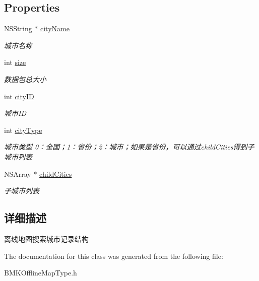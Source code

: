 \subsection*{Properties}
\begin{DoxyCompactItemize}
\item 
\hypertarget{interface_b_m_k_o_l_search_record_a9b511c21c21f4b67eef345b11c0e9826}{N\-S\-String $\ast$ \hyperlink{interface_b_m_k_o_l_search_record_a9b511c21c21f4b67eef345b11c0e9826}{city\-Name}}\label{interface_b_m_k_o_l_search_record_a9b511c21c21f4b67eef345b11c0e9826}

\begin{DoxyCompactList}\small\item\em 城市名称 \end{DoxyCompactList}\item 
\hypertarget{interface_b_m_k_o_l_search_record_a65d925120ac45eec0047bad23225f67f}{int \hyperlink{interface_b_m_k_o_l_search_record_a65d925120ac45eec0047bad23225f67f}{size}}\label{interface_b_m_k_o_l_search_record_a65d925120ac45eec0047bad23225f67f}

\begin{DoxyCompactList}\small\item\em 数据包总大小 \end{DoxyCompactList}\item 
\hypertarget{interface_b_m_k_o_l_search_record_a45d36f0768cca26895c7078900ad8d7b}{int \hyperlink{interface_b_m_k_o_l_search_record_a45d36f0768cca26895c7078900ad8d7b}{city\-I\-D}}\label{interface_b_m_k_o_l_search_record_a45d36f0768cca26895c7078900ad8d7b}

\begin{DoxyCompactList}\small\item\em 城市\-I\-D \end{DoxyCompactList}\item 
\hypertarget{interface_b_m_k_o_l_search_record_a74c11b249d3d97503c4a4efa880cc99a}{int \hyperlink{interface_b_m_k_o_l_search_record_a74c11b249d3d97503c4a4efa880cc99a}{city\-Type}}\label{interface_b_m_k_o_l_search_record_a74c11b249d3d97503c4a4efa880cc99a}

\begin{DoxyCompactList}\small\item\em 城市类型 0：全国；1：省份；2：城市；如果是省份，可以通过child\-Cities得到子城市列表 \end{DoxyCompactList}\item 
\hypertarget{interface_b_m_k_o_l_search_record_a883fcb06413f7da8b4e8a50e038a3e78}{N\-S\-Array $\ast$ \hyperlink{interface_b_m_k_o_l_search_record_a883fcb06413f7da8b4e8a50e038a3e78}{child\-Cities}}\label{interface_b_m_k_o_l_search_record_a883fcb06413f7da8b4e8a50e038a3e78}

\begin{DoxyCompactList}\small\item\em 子城市列表 \end{DoxyCompactList}\end{DoxyCompactItemize}


\subsection{详细描述}
离线地图搜索城市记录结构 

The documentation for this class was generated from the following file\-:\begin{DoxyCompactItemize}
\item 
B\-M\-K\-Offline\-Map\-Type.\-h\end{DoxyCompactItemize}
